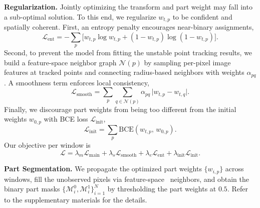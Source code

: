 \noindent\textbf{Regularization.} Jointly optimizing the transform and part weight may fall into a sub-optimal solution. To this end, we regularize $w_{t,p}$ to be confident and spatially coherent. First, an entropy penalty encourages near-binary assignments,
\[
\mathcal{L}_{\mathrm{ent}}=-\sum_{p}\Big[w_{t,p}\log w_{t,p}+(1-w_{t,p})\log(1-w_{t,p})\Big].
\]
Second, to prevent the model from fitting the unstable point tracking results, we build a feature-space neighbor graph $\mathcal{N}(p)$ by sampling per-pixel image features at tracked points and connecting radius-based neighbors with weights $\alpha_{pq}$. A smoothness term enforces local consistency,
\[
\mathcal{L}_{\mathrm{smooth}}=\sum_{p}\sum_{q\in\mathcal{N}(p)}\alpha_{pq}\,\big|w_{t,p}-w_{t,q}\big|.
\]
Finally, we discourage part weights from being too different from the initial weights $w_{0,p}$ with BCE loss $\mathcal{L}_{\mathrm{init}}$,
\[
\mathcal{L}_{\mathrm{init}}=\sum_{p}\mathrm{BCE}\!\left(w_{t,p},\,w_{0,p}\right).
\]
Our objective per window is
\[
\mathcal{L}=\lambda_m\mathcal{L}_{\mathrm{main}}
+\lambda_s\mathcal{L}_{\mathrm{smooth}}
+\lambda_e\mathcal{L}_{\mathrm{ent}}
+\lambda_{\mathrm{init}}\mathcal{L}_{\mathrm{init}}.
\]

\noindent\textbf{Part Segmentation.} We propagate the optimized part weights $\{w_{i,p}\}$ across windows, fill the unobserved pixels via feature-space~\cite{simeoni2025dinov3} neighbors, and obtain the binary part masks $\{\mathcal{M}^0_i,\mathcal{M}^1_i\}_{i=1}^N$ by thresholding the part weights at $0.5$. Refer to the supplementary materials for the details.




